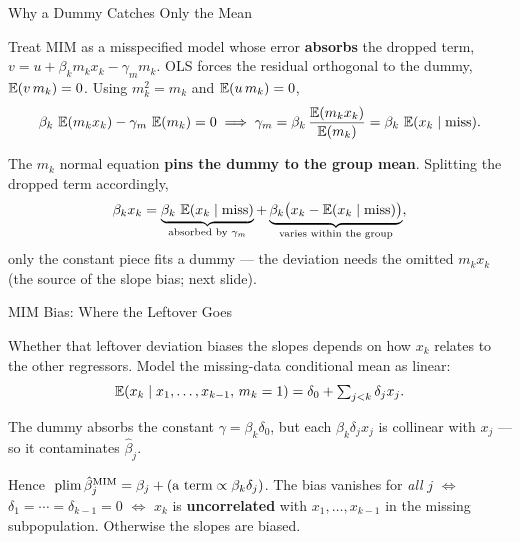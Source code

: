 \documentclass[aspectratio=169, 12pt]{beamer}
\begin{document}
\begin{frame}{Why a Dummy Catches Only the Mean}

  Treat MIM as a misspecified model whose error \textbf{absorbs} the dropped term,
  $v = u + \beta_k m_k x_k - \gamma_m m_k$. OLS forces the residual orthogonal to the
  dummy, $\operatorname{\mathbb{E}}(v\,m_k)=0$. Using $m_k^2 = m_k$ and $\operatorname{\mathbb{E}}(u\,m_k)=0$,
  \[
    \beta_k\,\operatorname{\mathbb{E}}(m_k x_k) - \gamma_m\,\operatorname{\mathbb{E}}(m_k) = 0
    \;\Longrightarrow\;
    \gamma_m = \beta_k\,\frac{\operatorname{\mathbb{E}}(m_k x_k)}{\operatorname{\mathbb{E}}(m_k)} = \beta_k\,\operatorname{\mathbb{E}}(x_k\mid\text{miss}) .
  \]

  \begin{keybox}
    The $m_k$ normal equation \textbf{pins the dummy to the group mean}. Splitting the
    dropped term accordingly,
    \[
      \beta_k x_k
      = \underbrace{\beta_k\,\operatorname{\mathbb{E}}(x_k\mid\text{miss})}_{\text{absorbed by }\gamma_m}
      + \underbrace{\beta_k\bigl(x_k - \operatorname{\mathbb{E}}(x_k\mid\text{miss})\bigr)}_{\text{varies within the group}} ,
    \]
    only the constant piece fits a dummy --- the deviation needs the omitted $m_k x_k$
    (the source of the slope bias; next slide).
  \end{keybox}

\end{frame}

\begin{frame}{MIM Bias: Where the Leftover Goes}

  Whether that leftover deviation biases the slopes depends on how $x_k$ relates to the
  other regressors. Model the missing-data conditional mean as linear:
  \[
    \operatorname{\mathbb{E}}(x_k \mid x_1, \ldots, x_{k-1},\, m_k = 1)
      = \delta_0 + \textstyle\sum_{j<k}\delta_j x_j .
  \]

  \begin{keybox}
    The dummy absorbs the constant $\gamma = \beta_k\delta_0$, but each
    $\beta_k\delta_j x_j$ is collinear with $x_j$ --- so it contaminates $\hat\beta_j$.
  \end{keybox}

  \begin{highlightbox}
    Hence $\;\operatorname{plim} \hat\beta_j^{\text{MIM}} = \beta_j + (\text{a term} \propto
    \beta_k\delta_j)$. The bias vanishes for \emph{all} $j$ \;$\iff$\;
    $\delta_1 = \cdots = \delta_{k-1} = 0$ \;$\iff$\; $x_k$ is \textbf{uncorrelated} with
    $x_1, \ldots, x_{k-1}$ in the missing subpopulation. Otherwise the slopes are biased.
  \end{highlightbox}

\end{frame}
\end{document}
